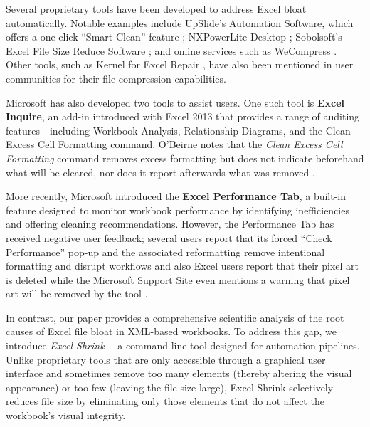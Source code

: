 \documentclass[conference]{IEEEtran}
\begin{document}
Several proprietary tools have been developed to address Excel bloat automatically. Notable examples include UpSlide’s Automation Software, which offers a one-click “Smart Clean” feature \cite{upslide_blog}; NXPowerLite Desktop \cite{neuxpower2024nxpowerlite}; Sobolsoft’s Excel File Size Reduce Software \cite{sobolsoft}; and online services such as WeCompress \cite{wecompress}. Other tools, such as Kernel for Excel Repair \cite{kernel_excel}, have also been mentioned in user communities for their file compression capabilities.

Microsoft has also developed two tools to assist users. One such tool is \textbf{Excel Inquire}, an add-in introduced with Excel 2013 that provides a range of auditing features—including Workbook Analysis, Relationship Diagrams, and the Clean Excess Cell Formatting command. O'Beirne notes that the \textit{Clean Excess Cell Formatting} command removes excess formatting but does not indicate beforehand what will be cleared, nor does it report afterwards what was removed \cite{obeirne2013}.

More recently, Microsoft introduced the \textbf{Excel Performance Tab}, a built-in feature designed to monitor workbook performance by identifying inefficiencies and offering cleaning recommendations. However, the Performance Tab has received negative user feedback; several users report that its forced “Check Performance” pop-up and the associated reformatting remove intentional formatting and disrupt workflows \cite{mrexcel2024check,microsoft_cleanup} and also Excel users report that their pixel art is deleted \cite{mrexcel2024check} while the Microsoft Support Site even mentions a warning that pixel art will be removed by the tool \cite{microsoft_cleanup}.

In contrast, our paper provides a comprehensive scientific analysis of the root causes of Excel file bloat in XML-based workbooks. To address this gap, we introduce \textit{Excel Shrink}--- a command-line tool designed for automation pipelines. Unlike proprietary tools that are only accessible through a graphical user interface and sometimes remove too many elements (thereby altering the visual appearance) or too few (leaving the file size large), Excel Shrink selectively reduces file size by eliminating only those elements that do not affect the workbook’s visual integrity.
\end{document}
